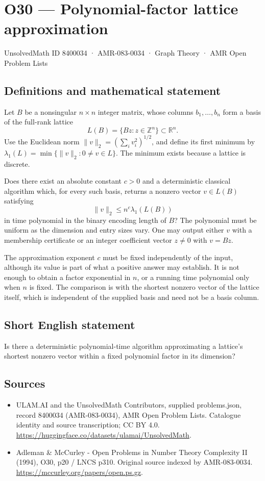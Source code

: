 \documentclass[11pt,a4paper]{article}
\begin{document}
\section*{O30 — Polynomial-factor lattice approximation}\label{8400034}
{\small UnsolvedMath ID 8400034 · AMR-083-0034 · Graph Theory · AMR Open Problem Lists}
\subsection{Definitions and mathematical statement}
Let $B$ be a nonsingular $n\times n$ integer matrix, whose columns $b_1,\ldots,b_n$ form a basis of the full-rank lattice
\[
L(B)=\{Bz:z\in\mathbb Z^n\}\subset\mathbb R^n.
\]
Use the Euclidean norm $\|v\|_2=(\sum_i v_i^2)^{1/2}$, and define its first minimum by $\lambda_1(L)=\min\{\|v\|_2:0\ne v\in L\}$. The minimum exists because a lattice is discrete.

Does there exist an absolute constant $c>0$ and a deterministic classical algorithm which, for every such basis, returns a nonzero vector $v\in L(B)$ satisfying
\[
\|v\|_2\le n^c\lambda_1(L(B))
\]
in time polynomial in the binary encoding length of $B$? The polynomial must be uniform as the dimension and entry sizes vary. One may output either $v$ with a membership certificate or an integer coefficient vector $z\ne0$ with $v=Bz$.

The approximation exponent $c$ must be fixed independently of the input, although its value is part of what a positive answer may establish. It is not enough to obtain a factor exponential in $n$, or a running time polynomial only when $n$ is fixed. The comparison is with the shortest nonzero vector of the lattice itself, which is independent of the supplied basis and need not be a basis column.
\subsection{Short English statement}
Is there a deterministic polynomial-time algorithm approximating a lattice’s shortest nonzero vector within a fixed polynomial factor in its dimension?
\subsection{Sources}
\begin{itemize}
\item[S1] ULAM.AI and the UnsolvedMath Contributors, supplied problems.json, record 8400034 (AMR-083-0034), AMR Open Problem Lists. Catalogue identity and source transcription; CC BY 4.0.
\url{https://huggingface.co/datasets/ulamai/UnsolvedMath}.
\item[S2] Adleman \& McCurley - Open Problems in Number Theory Complexity II (1994), O30, p20 / LNCS p310. Original source indexed by AMR-083-0034.
\url{https://mccurley.org/papers/open.ps.gz}.
\end{itemize}
\end{document}
